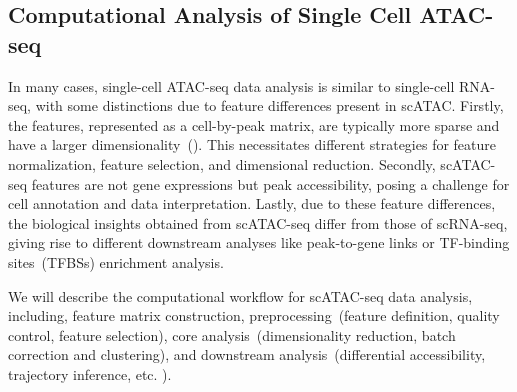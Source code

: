 \subsection{Computational Analysis of Single Cell ATAC-seq}
\label{background:sec2:scATAC}
In many cases, single-cell ATAC-seq data analysis is similar to single-cell RNA-seq, with some distinctions due to feature differences present in scATAC. Firstly, the features, represented as a cell-by-peak matrix, are typically more sparse and have a larger dimensionality~(). This necessitates different strategies for feature normalization, feature selection, and dimensional reduction. Secondly, scATAC-seq features are not gene expressions but peak accessibility, posing a challenge for cell annotation and data interpretation. Lastly, due to these feature differences, the biological insights obtained from scATAC-seq differ from those of scRNA-seq, giving rise to different downstream analyses like peak-to-gene links or TF-binding sites~(TFBSs) enrichment analysis.

We will describe the computational workflow for scATAC-seq data analysis, including, feature matrix construction, preprocessing~(feature definition, quality control, feature selection), core analysis~(dimensionality reduction, batch correction and clustering), and downstream analysis~(differential accessibility, trajectory inference, etc. ).

